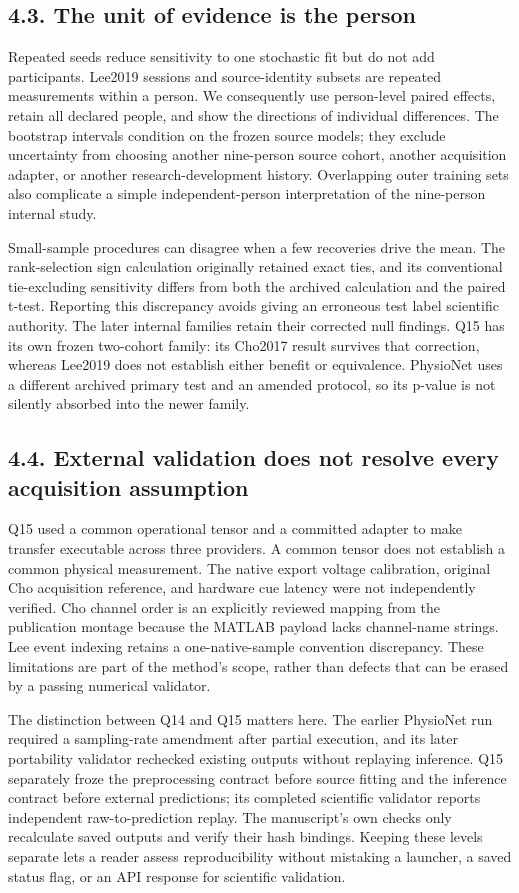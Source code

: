 \documentclass[11pt]{article}
\begin{document}
\subsection*{4.3. The unit of evidence is the person}
Repeated seeds reduce sensitivity to one stochastic fit but do not add participants. Lee2019 sessions and source-identity subsets are repeated measurements within a person. We consequently use person-level paired effects, retain all declared people, and show the directions of individual differences. The bootstrap intervals condition on the frozen source models; they exclude uncertainty from choosing another nine-person source cohort, another acquisition adapter, or another research-development history. Overlapping outer training sets also complicate a simple independent-person interpretation of the nine-person internal study.

Small-sample procedures can disagree when a few recoveries drive the mean. The rank-selection sign calculation originally retained exact ties, and its conventional tie-excluding sensitivity differs from both the archived calculation and the paired t-test. Reporting this discrepancy avoids giving an erroneous test label scientific authority. The later internal families retain their corrected null findings. Q15 has its own frozen two-cohort family: its Cho2017 result survives that correction, whereas Lee2019 does not establish either benefit or equivalence. PhysioNet uses a different archived primary test and an amended protocol, so its p-value is not silently absorbed into the newer family.

\subsection*{4.4. External validation does not resolve every acquisition assumption}
Q15 used a common operational tensor and a committed adapter to make transfer executable across three providers. A common tensor does not establish a common physical measurement. The native export voltage calibration, original Cho acquisition reference, and hardware cue latency were not independently verified. Cho channel order is an explicitly reviewed mapping from the publication montage because the MATLAB payload lacks channel-name strings. Lee event indexing retains a one-native-sample convention discrepancy. These limitations are part of the method's scope, rather than defects that can be erased by a passing numerical validator.

The distinction between Q14 and Q15 matters here. The earlier PhysioNet run required a sampling-rate amendment after partial execution, and its later portability validator rechecked existing outputs without replaying inference. Q15 separately froze the preprocessing contract before source fitting and the inference contract before external predictions; its completed scientific validator reports independent raw-to-prediction replay. The manuscript's own checks only recalculate saved outputs and verify their hash bindings. Keeping these levels separate lets a reader assess reproducibility without mistaking a launcher, a saved status flag, or an API response for scientific validation.
\end{document}
